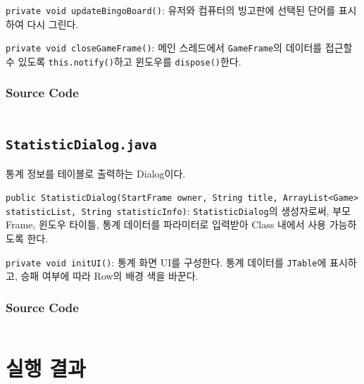\texttt{private void updateBingoBoard()}:
유저와 컴퓨터의 빙고판에 선택된 단어를 표시하여 다시 그린다.

\texttt{private void closeGameFrame()}:
메인 스레드에서 \texttt{GameFrame}의 데이터를 접근할 수 있도록 \texttt{this.notify()}하고 윈도우를 \texttt{dispose()}한다.

\subsubsection{Source Code}
\inputminted[fontsize=\scriptsize]{java}{../../src/main/java/ywrhee/project/GameFrame.java}

\newpage
\subsection{\texttt{StatisticDialog.java}}
통계 정보를 테이블로 출력하는 Dialog이다.

\texttt{public StatisticDialog(StartFrame owner, String title, ArrayList<Game> statisticList, String statisticInfo)}:
\texttt{StatisticDialog}의 생성자로써, 부모 Frame, 윈도우 타이틀, 통계 데이터를 파라미터로 입력받아 Class 내에서 사용 가능하도록 한다.

\texttt{private void initUI()}:
통계 화면 UI를 구성한다.
통계 데이터를 \texttt{JTable}에 표시하고, 승패 여부에 따라 Row의 배경 색을 바꾼다.

\subsubsection{Source Code}
\inputminted[fontsize=\scriptsize]{java}{../../src/main/java/ywrhee/project/StatisticDialog.java}

\newpage
\section{실행 결과}
